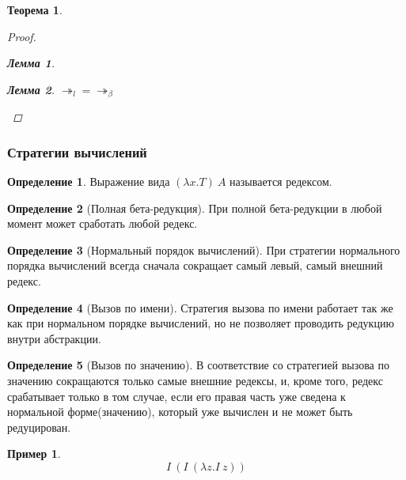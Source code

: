 \documentclass[10pt,twoside]{article}
\theoremstyle{plain}
\newtheorem{thm}{Теорема}
\newtheorem{lemma}{Лемма}
\theoremstyle{definition}
\newtheorem{defi}{Определение}
\newtheorem*{example}{Пример}
\begin{document}
\begin{thm}
\begin{proof}
\begin{lemma}
      \begin{center}
      \end{center}
    \end{lemma}
    \begin{lemma}
      $\twoheadrightarrow_l = \twoheadrightarrow_\beta$
    \end{lemma}
  \end{proof}
\end{thm}

\subsubsection{Стратегии вычислений}

\begin{defi}
  Выражение вида $(\lambda x.T)\ A$ называется редексом.
\end{defi}

\begin{defi}[Полная бета-редукция]
  При полной бета-редукции в любой момент может сработать любой редекс.
\end{defi}

\begin{defi}[Нормальный порядок вычислений]
  При стратегии нормального порядка вычислений всегда сначала сокращает самый левый, самый внешний редекс.
\end{defi}

\begin{defi}[Вызов по имени]
  Стратегия вызова по имени работает так же как при нормальном порядке вычислений, но не позволяет проводить редукцию внутри абстракции.
\end{defi}

\begin{defi}[Вызов по значению]
  В соответствие со стратегией вызова по значению сокращаются только самые внешние редексы, и, кроме того, редекс срабатывает только в том случае, если его правая часть уже сведена к нормальной форме(значению), который уже вычислен и не может быть редуцирован.
\end{defi}

\begin{example}
  $$I\ (I\ (\lambda z.I\ z))$$
\end{example}
\end{document}
